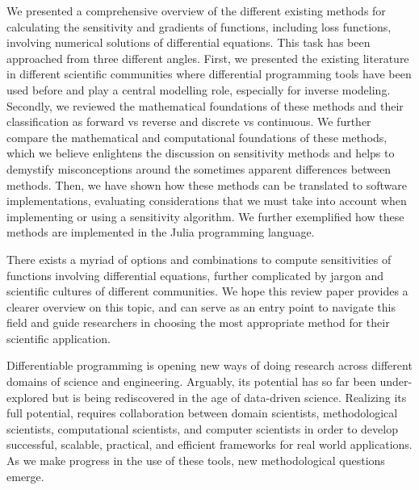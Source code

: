 We presented a comprehensive overview of the different existing methods for calculating the sensitivity and gradients of functions, including loss functions, involving numerical solutions of differential equations.
This task has been approached from three different angles.
First, we presented the existing literature in different scientific communities where differential programming tools have been used before and play a central modelling role, especially for inverse modeling.
Secondly, we reviewed the mathematical foundations of these methods and their classification as forward vs reverse and discrete vs continuous.
We further compare the mathematical and computational foundations of these methods, which we believe enlightens the discussion on sensitivity methods and helps to demystify  misconceptions around the sometimes apparent differences between methods.  
Then, we have shown how these methods can be translated to software implementations, evaluating considerations that we must take into account when implementing or using a sensitivity algorithm. 
We further exemplified how these methods are implemented in the Julia programming language. 

There exists a myriad of options and combinations to compute sensitivities of functions involving differential equations, further complicated by jargon and scientific cultures of different communities. 
We hope this review paper provides a clearer overview on this topic, and can serve as an entry point to navigate this field and guide researchers in choosing the most appropriate method for their scientific application.

Differentiable programming is opening new ways of doing research across different domains of science and engineering. 
Arguably, its potential has so far been under-explored but is being rediscovered in the age of data-driven science. 
Realizing its full potential, requires collaboration between domain scientists, methodological scientists, computational scientists, and computer scientists in order to develop successful, scalable, practical, and efficient frameworks for real world applications.
As we make progress in the use of these tools, new methodological questions emerge. 
